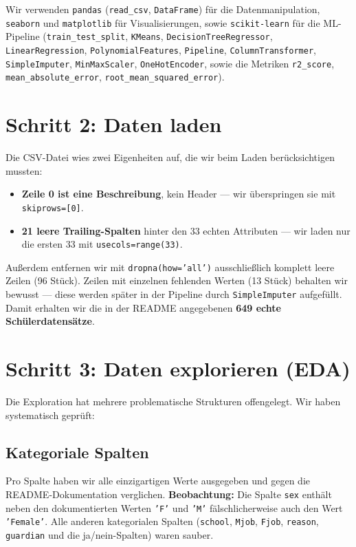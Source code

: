 \documentclass[11pt,a4paper]{article}
\begin{document}
Wir verwenden \texttt{pandas} (\texttt{read\_csv}, \texttt{DataFrame}) für die Datenmanipulation, \texttt{seaborn} und \texttt{matplotlib} für Visualisierungen, sowie \texttt{scikit-learn} für die ML-Pipeline (\texttt{train\_test\_split}, \texttt{KMeans}, \texttt{DecisionTreeRegressor}, \texttt{LinearRegression}, \texttt{PolynomialFeatures}, \texttt{Pipeline}, \texttt{ColumnTransformer}, \texttt{SimpleImputer}, \texttt{MinMaxScaler}, \texttt{OneHotEncoder}, sowie die Metriken \texttt{r2\_score}, \texttt{mean\_absolute\_error}, \texttt{root\_mean\_squared\_error}).

\section{Schritt 2: Daten laden}

Die CSV-Datei wies zwei Eigenheiten auf, die wir beim Laden berücksichtigen mussten:

\begin{itemize}
    \item \textbf{Zeile 0 ist eine Beschreibung}, kein Header --- wir überspringen sie mit \texttt{skiprows=[0]}.
    \item \textbf{21 leere Trailing-Spalten} hinter den 33 echten Attributen --- wir laden nur die ersten 33 mit \texttt{usecols=range(33)}.
\end{itemize}

Außerdem entfernen wir mit \texttt{dropna(how='all')} ausschließlich komplett leere Zeilen (96 Stück). Zeilen mit einzelnen fehlenden Werten (13 Stück) behalten wir bewusst --- diese werden später in der Pipeline durch \texttt{SimpleImputer} aufgefüllt. Damit erhalten wir die in der README angegebenen \textbf{649 echte Schülerdatensätze}.

\section{Schritt 3: Daten explorieren (EDA)}

Die Exploration hat mehrere problematische Strukturen offengelegt. Wir haben systematisch geprüft:

\subsection{Kategoriale Spalten}
Pro Spalte haben wir alle einzigartigen Werte ausgegeben und gegen die README-Dokumentation verglichen. \textbf{Beobachtung:} Die Spalte \texttt{sex} enthält neben den dokumentierten Werten \texttt{'F'} und \texttt{'M'} fälschlicherweise auch den Wert \texttt{'Female'}. Alle anderen kategorialen Spalten (\texttt{school}, \texttt{Mjob}, \texttt{Fjob}, \texttt{reason}, \texttt{guardian} und die ja/nein-Spalten) waren sauber.
\end{document}
